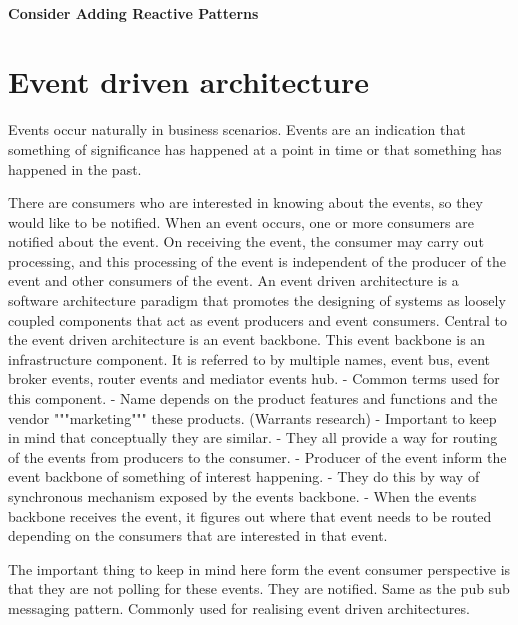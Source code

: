 \paragraph{Consider Adding Reactive Patterns}

\section{Event driven architecture}
Events occur naturally in business scenarios.
Events are an indication that something of significance has happened at a point in time or that something has happened in the past.

There are consumers who are interested in knowing about the events, so they would like to be notified.
When an event occurs, one or more consumers are notified about the event.
On receiving the event, the consumer may carry out processing, and this processing of the event is independent of the producer of the event and other consumers of the event.
An event driven architecture is a software architecture paradigm that promotes the designing of systems as loosely coupled components that act as event producers and event consumers.
Central to the event driven architecture is an event backbone.
This event backbone is an infrastructure component.
It is referred to by multiple names, event bus, event broker events, router events and mediator events hub.
- Common terms used for this component.
- Name depends on the product features and functions and the vendor """marketing""" these products. (Warrants research)
- Important to keep in mind that conceptually they are similar.
- They all provide a way for routing of the events from producers to the consumer.
- Producer of the event inform the event backbone of something of interest happening.
- They do this by way of synchronous mechanism exposed by the events backbone.
- When the events backbone receives the event, it figures out where that event needs to be routed depending on the consumers that are interested in that event.

The important thing to keep in mind here form the event consumer perspective is that they are not polling for these events. They are notified.
Same as the pub sub messaging pattern.
Commonly used for realising event driven architectures.

